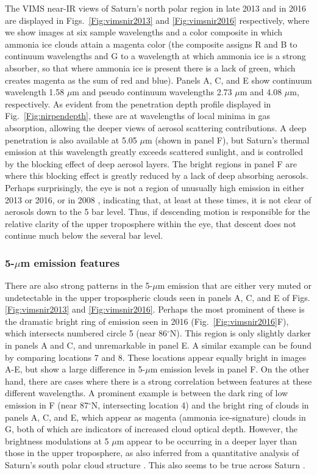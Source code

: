 \documentclass[article,11pt]{emulateapj}
\def\degx{$^\circ$}
\def\mum{$\mu$m }
\def\mumx{$\mu$m}
\begin{document}
The VIMS near-IR views of Saturn's north polar region in late 2013 and
in 2016 are displayed in Figs.\ \ref{Fig:vimsnir2013} and
\ref{Fig:vimsnir2016} respectively, where we show images at six sample
wavelengths and a color composite in which ammonia ice clouds attain a
magenta color (the composite assigns R and B to continuum wavelengths
and G to a wavelength at which ammonia ice is a strong absorber, so
that where ammonia ice is present there is a lack of green, which
creates magenta as the sum of red and blue).  Panels A, C, and E show
continuum wavelength 1.58 \mum and pseudo continuum wavelengths 2.73
\mum and 4.08 \mumx, respectively.  As evident from the penetration
depth profile displayed in Fig.\ \ref{Fig:nirpendepth}, these are at
wavelengths of local minima in gas absorption, allowing the deeper
views of aerosol scattering contributions.  A deep penetration is also
available at 5.05 \mum (shown in panel F), but Saturn's thermal
emission at this wavelength greatly exceeds scattered sunlight, and is
controlled by the blocking effect of deep aerosol layers. The bright
regions in panel F are where this blocking effect is greatly reduced
by a lack of deep absorbing aerosols.  Perhaps surprisingly, the eye
is not a region of unusually high emission in either 2013 or 2016, or
in 2008 \citep{Baines2009cyclone}, indicating that, at least at these
times, it is not clear of aerosols down to the 5 bar level. Thus, if
descending motion is responsible for the relative clarity of the upper
troposphere within the eye, that descent does not continue much below
the several bar level.

\subsubsection{5-\mum emission features}

There are also strong patterns in the 5-\mum emission that are either
very muted or undetectable in the upper tropospheric clouds seen in
panels A, C, and E of Figs. \ref{Fig:vimsnir2013} and
\ref{Fig:vimsnir2016}.  Perhaps the most prominent of these is the
dramatic bright ring of emission seen in 2016
(Fig.\ \ref{Fig:vimsnir2016}F), which intersects numbered circle 5
(near 86\degx N).  This region is only slightly darker in panels A and
C, and unremarkable in panel E.  A similar example can be found by
comparing locations 7 and 8.  These locations appear equally bright in images A-E,
but show a large difference in 5-\mum emission levels in panel F.  On
the other hand, there are cases where there is a strong correlation
between features at these different wavelengths.  A prominent example
is between the dark ring of low emission in F (near 87\degx N,
intersecting location 4) and the bright ring of clouds in panels A, C,
and E, which appear as magenta (ammonia ice-signature) clouds in G,
both of which are indicators of increased cloud optical depth.
However, the brightness modulations at 5 \mum appear to be occurring
in a deeper layer than those in the upper troposphere, as also
inferred from a quantitative analysis of Saturn's south polar cloud
structure \citep{Sro2020spole}. This also seems to be true across Saturn
\citep{Baines2005,Baines2009cyclone,Fletcher2011Sci}.
\end{document}
